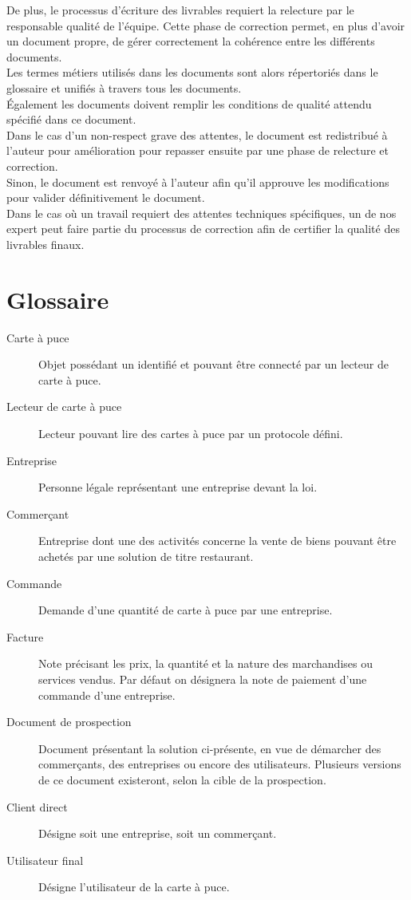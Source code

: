 De plus, le processus d'écriture des livrables requiert la relecture par le
responsable qualité de l'équipe. Cette phase de correction permet, en plus
d'avoir un document propre, de gérer correctement la cohérence entre les
différents documents. \\

Les termes métiers utilisés dans les documents sont alors répertoriés dans le
glossaire et unifiés à travers tous les documents. \\
Également les documents doivent remplir les conditions de qualité attendu
spécifié dans ce document. \\

Dans le cas d'un non-respect grave des attentes, le document est redistribué à
l'auteur pour amélioration pour repasser ensuite par une phase de relecture et
correction. \\
Sinon, le document est renvoyé à l'auteur afin qu'il approuve les modifications
pour valider définitivement le document. \\

Dans le cas où un travail requiert des attentes techniques spécifiques, un de
nos expert peut faire partie du processus de correction afin de certifier la
qualité des livrables finaux. \\

\section{Glossaire}

\begin{description}
  \item[Carte à puce] Objet possédant un identifié et pouvant être connecté par
    un lecteur de carte à puce.
  \item[Lecteur de carte à puce] Lecteur pouvant lire des cartes à puce par un
    protocole défini.
  \item[Entreprise] Personne légale représentant une entreprise devant la loi.
  \item[Commerçant] Entreprise dont une des activités concerne la vente de
    biens pouvant être achetés par une solution de titre restaurant.
  \item[Commande] Demande d'une quantité de carte à puce par une entreprise.
  \item[Facture] Note précisant les prix, la quantité et la nature des
    marchandises ou services vendus. Par défaut on désignera la note de
    paiement d'une commande d'une entreprise.
  \item[Document de prospection] Document présentant la solution ci-présente,
    en vue de démarcher des commerçants, des entreprises ou encore des
    utilisateurs. Plusieurs versions de ce document existeront, selon la cible
    de la prospection.
  \item[Client direct] Désigne soit une entreprise, soit un commerçant.
  \item[Utilisateur final] Désigne l'utilisateur de la carte à puce.
\end{description}



